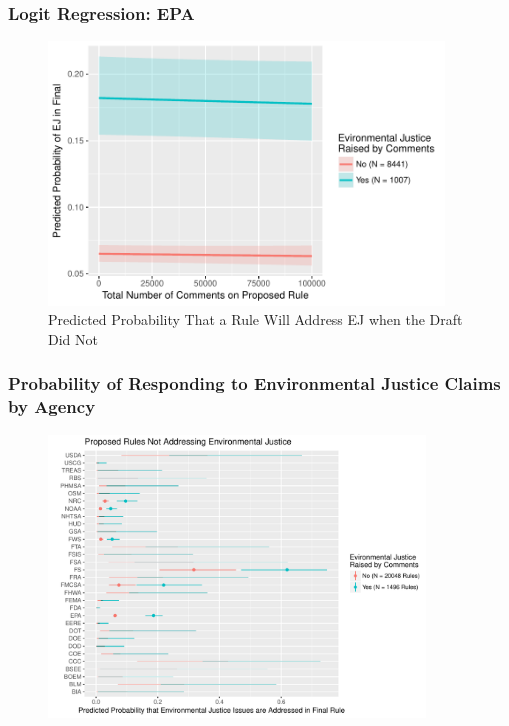 \documentclass[10pt]{beamer}
\begin{document}
\begin{frame}
\frametitle{Logit Regression: EPA}
\begin{figure}
\caption{Predicted Probability That a Rule Will Address EJ when the Draft Did Not}
\includegraphics[height = 7cm]{ej_prob_epa_nprms.pdf}
\end{figure}
\end{frame}

\begin{frame}
\frametitle{Probability of Responding to Environmental Justice Claims by Agency}
\begin{figure}
\includegraphics[height = 7.5cm]{ej_prprob_by_agency.pdf}
\end{figure}
\end{frame}
\end{document}
